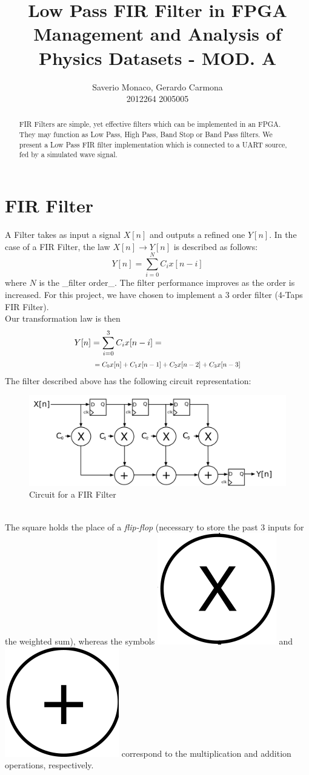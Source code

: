 \documentclass[11pt,a4paper,twocolumn]{IEEEtran}
\author{Saverio Monaco, Gerardo Carmona\\ 2012264\hspace{1.5cm} 2005005\\ \sepline}
\title{\textbf{Low Pass FIR Filter in FPGA}\\ Management and Analysis of Physics Datasets - MOD. A}
\newcommand*{\Scale}[2][4]{\scalebox{#1}{$#2$}}
\begin{document}
	\maketitle
	\begin{abstract}
		FIR Filters are simple, yet effective filters which can be implemented in an FPGA. They may function as Low Pass, High Pass, Band Stop or Band Pass filters. We present a Low Pass FIR filter implementation which is connected to a UART source, fed by a simulated wave signal.
	\end{abstract}
	\section{FIR Filter}
	A Filter takes as input a signal $X[n]$ and outputs a refined one $Y[n]$. In the case of a FIR Filter, the law $X[n]\to Y[n]$ is described as follows: 
	$$ Y[n] = \sum_{i=0}^N C_i x[n-i] $$
	where $N$ is the _filter order_. The filter performance improves as the order is increased. For this project, we have chosen to implement a 3 order filter (4-Taps FIR Filter).\\ Our transformation law is then
	$$\begin{aligned} Y[n]&=\sum_{i=0}^3 C_ix[n-i]=\\ & \Scale[0.8]{\hspace*{.2cm}=C_0x[n]+C_1x[n-1]+C_2x[n-2]+C_3x[n-3]}\end{aligned}$$
	The filter described above has the following circuit representation:
	\begin{figure}[h]
		\centering
		\includegraphics[width=1\linewidth]{img/FIR_direct_svg}
		\caption{Circuit for a FIR Filter}
	\end{figure}\\
	The square holds the place of a \emph{flip-flop} (necessary to store the past 3 inputs for the weighted sum), whereas the symbols \includegraphics[width=0.05\linewidth]{img/x} and \includegraphics[width=0.05\linewidth]{img/+} correspond to the multiplication and addition operations, respectively.
\end{document}
